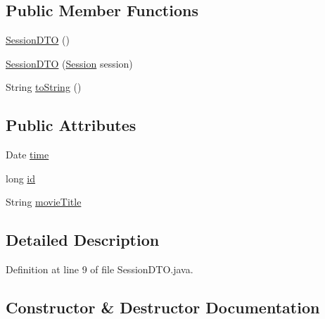 \subsection*{Public Member Functions}
\begin{DoxyCompactItemize}
\item 
\mbox{\hyperlink{classes_1_1deusto_1_1server_1_1data_1_1_session_d_t_o_a6bd48894fa99ffb816184e90a5a1fddc}{Session\+D\+TO}} ()
\item 
\mbox{\hyperlink{classes_1_1deusto_1_1server_1_1data_1_1_session_d_t_o_a8bdfa9095064ac9b72508b348302c852}{Session\+D\+TO}} (\mbox{\hyperlink{classes_1_1deusto_1_1server_1_1jdo_1_1_session}{Session}} session)
\item 
String \mbox{\hyperlink{classes_1_1deusto_1_1server_1_1data_1_1_session_d_t_o_a06afcafbaf96e02138b05c22aa66f9bc}{to\+String}} ()
\end{DoxyCompactItemize}
\subsection*{Public Attributes}
\begin{DoxyCompactItemize}
\item 
Date \mbox{\hyperlink{classes_1_1deusto_1_1server_1_1data_1_1_session_d_t_o_a38cf2d216aa3498c72da81c0f97ae3a0}{time}}
\item 
long \mbox{\hyperlink{classes_1_1deusto_1_1server_1_1data_1_1_session_d_t_o_a382bdd28e4dcfa064fe7fc50f85a732b}{id}}
\item 
String \mbox{\hyperlink{classes_1_1deusto_1_1server_1_1data_1_1_session_d_t_o_ab6b2608b4e2183f18defa70929e9c056}{movie\+Title}}
\end{DoxyCompactItemize}


\subsection{Detailed Description}


Definition at line 9 of file Session\+D\+T\+O.\+java.



\subsection{Constructor \& Destructor Documentation}
\mbox{\label{classes_1_1deusto_1_1server_1_1data_1_1_session_d_t_o_a6bd48894fa99ffb816184e90a5a1fddc}} 
